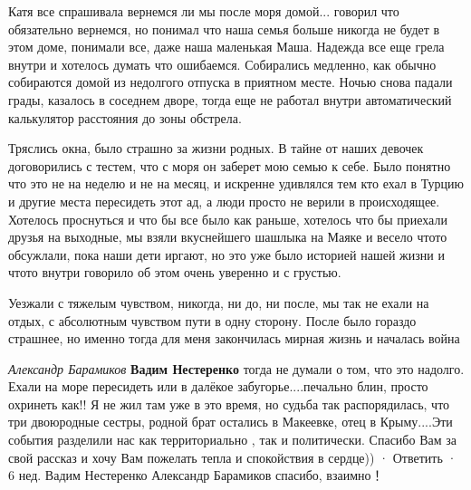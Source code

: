 \begin{itemize}
Катя все спрашивала вернемся ли мы после моря домой... говорил что обязательно
вернемся, но понимал что наша семья больше никогда не будет в этом доме,
понимали все, даже наша маленькая Маша. Надежда все еще грела внутри и хотелось
думать что ошибаемся. Собирались медленно, как обычно собираются домой из
недолгого отпуска в приятном месте. Ночью снова падали грады, казалось в
соседнем дворе, тогда еще не работал внутри автоматический калькулятор
расстояния до зоны обстрела. 

Тряслись окна, было страшно за жизни родных. В тайне от наших девочек
договорились с тестем, что с моря он заберет мою семью к себе. Было понятно что
это не на неделю и не на месяц, и искренне удивлялся тем кто ехал в Турцию и
другие места пересидеть этот ад, а люди просто не верили в происходящее.
Хотелось проснуться и что бы все было как раньше, хотелось что бы приехали
друзья на выходные, мы взяли вкуснейшего шашлыка на Маяке и весело чтото
обсужлали, пока наши дети иргают, но это уже было историей нашей жизни и чтото
внутри говорило об этом очень уверенно и с грустью. 

Уезжали с тяжелым чувством, никогда, ни до, ни после, мы так не ехали на отдых,
с абсолютным чувством пути в одну сторону. После было гораздо страшнее, но
именно тогда для меня закончилась мирная жизнь и началась война

\begin{itemize} %
\emph{Александр Барамиков}
\textbf{Вадим Нестеренко} тогда не думали о том, что это надолго. Ехали на море пересидеть или в далёкое забугорье....печально блин, просто охринеть как!! Я не жил там уже в это время, но судьба так распорядилась, что три двоюродные сестры, родной брат остались в Макеевке, отец в Крыму....Эти события разделили нас как территориально , так и политически. Спасибо Вам за свой рассказ и хочу Вам пожелать тепла и спокойствия в сердце))
 · Ответить · 6 нед.
Вадим Нестеренко
Александр Барамиков спасибо, взаимно！
\end{itemize} %



\end{itemize} %
